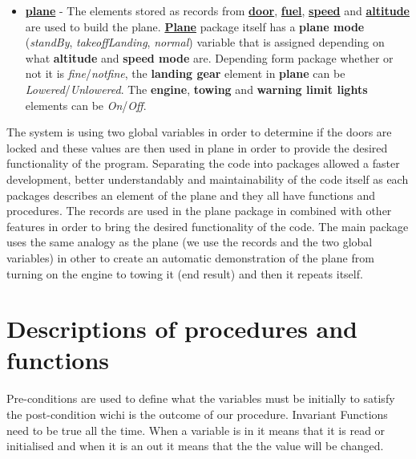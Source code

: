 \documentclass{llncs}
\begin{document}
\begin{itemize}
\item \textbf{\underline{plane}} - The elements stored as records from \textbf{\underline{door}}, \textbf{\underline{fuel}}, \textbf{\underline{speed}} and \textbf{\underline{altitude}} are used to build the plane. \textbf{\underline{Plane}} package itself has a {\textbf{plane mode}} (\textit{standBy}, \textit{takeoffLanding}, \textit{normal}) variable that is assigned depending on what {\textbf{altitude}} and {\textbf{speed mode}} are. Depending form package whether or not it is \textit{fine}/\textit{notfine}, the {\textbf{landing gear}} element in {\textbf{plane}} can be \textit{Lowered}/\textit{Unlowered}. The {\textbf{engine}}, {\textbf{towing}} and {\textbf{warning limit lights}} elements can be \textit{On}/\textit{Off}.
\end{itemize}

The system is using two global variables in order to determine if the doors are locked and these values are then used in plane in order to provide the desired functionality of the program. 
Separating the code into packages allowed a faster development, better understandably and maintainability of the code itself as each packages describes an element of the plane and they all have functions and procedures. 
The records are used in the plane package in combined with other features in order to bring the desired functionality of the code. 
The main package uses the same analogy as the plane (we use the records and the two global variables) in other to create an automatic demonstration of the plane from turning on the engine to towing it (end result) and then it repeats itself.

\section{Descriptions of procedures and functions}
Pre-conditions are used to define what the variables must be initially to satisfy the post-condition wichi is the outcome of our procedure. Invariant Functions need to be true all the time. When a variable is in it means that it is read or initialised and when it is an out it means that the the value will be changed. 
\end{document}
